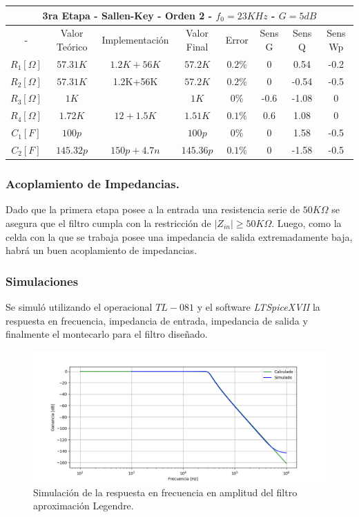 \begin{table}[H]
\centering
\begin{tabular}{@{}cccccccc@{}}
\multicolumn{8}{c}{3ra Etapa - Sallen-Key - Orden 2 - $f_0 = 23KHz$ - $G=5dB$} \\ \midrule
- & Valor Teórico & Implementación & Valor Final & Error & Sens G & Sens Q & Sens Wp \\ \midrule
$R_1 [\Omega]$ & $57.31K$ & $1.2K+56K$ & $57.2K$ & $0.2\%$ & 0 & 0.54 & -0.2 \\
$R_2 [\Omega]$ & $57.31K$ & 1.2K+56K & $57.2K$ & $0.2\%$ & 0 & -0.54 & -0.5 \\
$R_3 [\Omega]$ & $1K$ &  & $1K$ & $0\%$ & -0.6 & -1.08 & 0 \\
$R_4 [\Omega]$ & $1.72K$ & $12+1.5K$ & $1.51K$ & $0.1\%$ & 0.6 & 1.08 & 0 \\
$C_1 [F]$ & $100p$ &  & $100p$ & $0\%$ & 0 & 1.58 & -0.5 \\
$C_2 [F]$ & $145.32p$ & $150p+4.7n$ & $145.36p$ & $0.1\%$ & 0 & -1.58 & -0.5 \\ \bottomrule
\end{tabular}
\end{table}

\subsubsection{Acoplamiento de Impedancias.}
Dado que la primera etapa posee a la entrada una resistencia serie de $50K\Omega$ se asegura que el filtro cumpla con la restricción de $|Z_{in}| \geq 50K\Omega$. Luego, como la celda con la que se trabaja posee una impedancia de salida extremadamente baja, habrá un buen acoplamiento de impedancias.

\subsubsection{Simulaciones}

Se simuló utilizando el operacional $TL-081$ y el software \textit{LTSpiceXVII} la respuesta en frecuencia, impedancia de entrada, impedancia de salida y finalmente el montecarlo para el filtro diseñado.

\begin{figure}[H]
\centering
	\centering
	\includegraphics[width=\textwidth]{Imagenes-Ej1/legendre_hs_sim.png}
	\caption{Simulación de la respuesta en frecuencia en amplitud del filtro aproximación Legendre.}
	\label{leg_gain_sim}
\end{figure}


